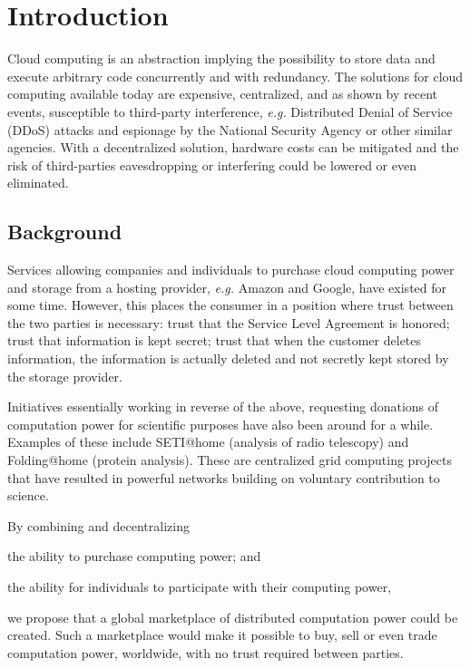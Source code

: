 \chapter{Introduction}
Cloud computing is an abstraction implying the possibility to store data and execute arbitrary code concurrently and with redundancy. The solutions for cloud computing available today are expensive, centralized, and as shown by recent events, susceptible to third-party interference, \emph{e.g.} Distributed Denial of Service (DDoS) attacks and espionage by the National Security Agency or other similar agencies. With a decentralized solution, hardware costs can be mitigated and the risk of third-parties eavesdropping or interfering could be lowered or even eliminated.

\section{Background}
Services allowing companies and individuals to purchase cloud computing power and storage from a hosting provider, \emph{e.g.} Amazon and Google, have existed for some time. However, this places the consumer in a position where trust between the two parties is necessary: trust that the Service Level Agreement is honored; trust that information is kept secret; trust that when the customer deletes information, the information is actually deleted and not secretly kept stored by the storage provider.

Initiatives essentially working in reverse of the above, requesting donations of computation power for scientific purposes have also been around for a while. Examples of these include SETI@home (analysis of radio telescopy) and Folding@home (protein analysis). These are centralized grid computing projects that have resulted in powerful networks building on voluntary contribution to science.

By combining and decentralizing
\begin{inparaenum}
\item the ability to purchase computing power; and
\item the ability for individuals to participate with their computing power,
\end{inparaenum}
we propose that a global marketplace of distributed computation power could be created. Such a marketplace would make it possible to buy, sell or even trade computation power, worldwide, with no trust required between parties.

